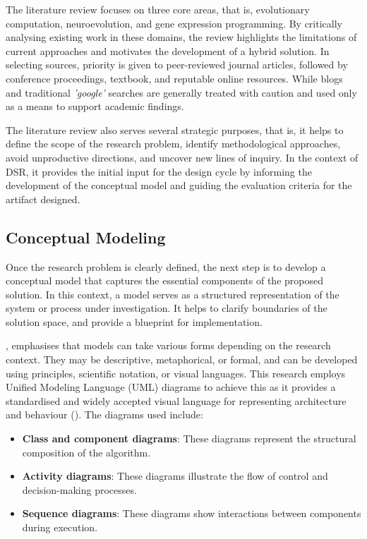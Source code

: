 \parbreak\noindent The literature review focuses on three core areas, that is, evolutionary computation, neuroevolution, and gene expression programming. By critically analysing existing work in these domains, the review highlights the limitations of current approaches and motivates the development of a hybrid solution. In selecting sources, priority is given to peer-reviewed journal articles, followed by conference proceedings, textbook, and reputable online resources. While blogs and traditional \textit{'google'} searches are generally treated with caution and used only as a means to support academic findings.

\parbreak\noindent The literature review also serves several strategic purposes, that is, it helps to define the scope of the research problem, identify methodological approaches, avoid unproductive directions, and uncover new lines of inquiry. In the context of DSR, it provides the initial input for the design cycle by informing the development of the conceptual model and guiding the evaluation criteria for the artifact designed.

\subsection{Conceptual Modeling}
Once the research problem is clearly defined, the next step is to develop a conceptual model that captures the essential components of the proposed solution. In this context, a model serves as a structured representation of the system or process under investigation. It helps to clarify boundaries of the solution space, and provide a blueprint for implementation.

\parbreak\noindent \cite{olivier2009information}, emphasises that models can take various forms depending on the research context. They may be descriptive, metaphorical, or formal, and can be developed using principles, scientific notation, or visual languages. This research employs Unified Modeling Language (UML) diagrams to achieve this as it provides a standardised and widely accepted visual language for representing architecture and behaviour (\cite{koc2021uml}). The diagrams used include:
\begin{itemize}
    \item \textbf{Class and component diagrams}: These diagrams represent the structural composition of the algorithm.
    \item \textbf{Activity diagrams}: These diagrams illustrate the flow of control and decision-making processes.
    \item \textbf{Sequence diagrams}: These diagrams show interactions between components during execution.
\end{itemize}

